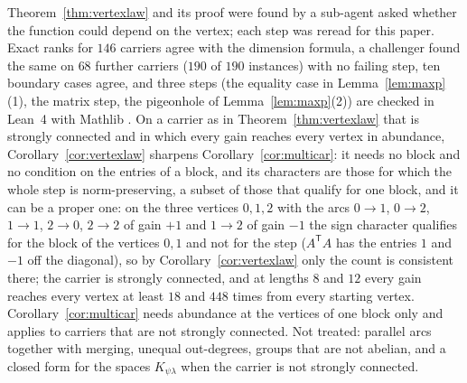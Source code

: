 Theorem~\ref{thm:vertexlaw} and its proof were found by a sub-agent asked whether the function could depend on the vertex; each step was reread for this paper. Exact ranks for $146$ carriers agree with the dimension formula, a challenger found the same on $68$ further carriers ($190$ of $190$ instances) with no failing step, ten boundary cases agree, and three steps (the equality case in Lemma~\ref{lem:maxp}(1), the matrix step, the pigeonhole of Lemma~\ref{lem:maxp}(2)) are checked in Lean~4 with Mathlib \cite{comp4s}. On a carrier as in Theorem~\ref{thm:vertexlaw} that is strongly connected and in which every gain reaches every vertex in abundance, Corollary~\ref{cor:vertexlaw} sharpens Corollary~\ref{cor:multicar}: it needs no block and no condition on the entries of a block, and its characters are those for which the whole step is norm-preserving, a subset of those that qualify for one block, and it can be a proper one: on the three vertices $0,1,2$ with the arcs $0\to1$, $0\to2$, $1\to1$, $2\to0$, $2\to2$ of gain $+1$ and $1\to2$ of gain $-1$ the sign character qualifies for the block of the vertices $0,1$ and not for the step ($A^{\mathsf T}A$ has the entries $1$ and $-1$ off the diagonal), so by Corollary~\ref{cor:vertexlaw} only the count is consistent there; the carrier is strongly connected, and at lengths $8$ and $12$ every gain reaches every vertex at least $18$ and $448$ times from every starting vertex. Corollary~\ref{cor:multicar} needs abundance at the vertices of one block only and applies to carriers that are not strongly connected. Not treated: parallel arcs together with merging, unequal out-degrees, groups that are not abelian, and a closed form for the spaces $K_{\psi\lambda}$ when the carrier is not strongly connected.

